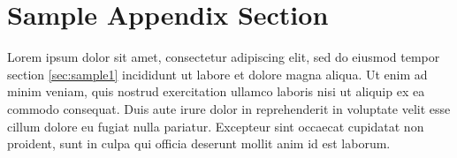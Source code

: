 \documentclass[5p,times]{elsarticle}
\begin{document}
\section{Sample Appendix Section}
\label{sec:sample:appendix}
Lorem ipsum dolor sit amet, consectetur adipiscing elit, sed do eiusmod tempor section \ref{sec:sample1} incididunt ut labore et dolore magna aliqua. Ut enim ad minim veniam, quis nostrud exercitation ullamco laboris nisi ut aliquip ex ea commodo consequat. Duis aute irure dolor in reprehenderit in voluptate velit esse cillum dolore eu fugiat nulla pariatur. Excepteur sint occaecat cupidatat non proident, sunt in culpa qui officia deserunt mollit anim id est laborum.

 






\end{document}
